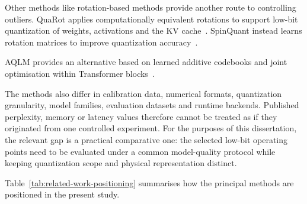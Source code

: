 Other methods like rotation-based methods provide another route to controlling outliers.
QuaRot applies computationally equivalent rotations to support
low-bit quantization of weights, activations and the KV
cache~\cite{ashkboos2024quarotoutlierfree4bitinference}.
SpinQuant instead learns rotation matrices to improve quantization
accuracy~\cite{liu2025spinquantllmquantizationlearned}.

AQLM provides an alternative based on learned additive codebooks and
joint optimisation within Transformer
blocks~\cite{egiazarian2024extremecompressionlargelanguage}.

The methods also differ in calibration data, numerical formats,
quantization granularity, model families, evaluation datasets and
runtime backends. Published perplexity, memory or latency values
therefore cannot be treated as if they originated from one controlled
experiment. For the purposes of this dissertation, the relevant gap is
a practical comparative one: the selected low-bit operating points need
to be evaluated under a common model-quality protocol while keeping
quantization scope and physical representation distinct.

Table~\ref{tab:related-work-positioning} summarises how the principal
methods are positioned in the present study.

